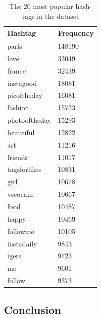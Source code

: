 \begin{center}
  \begin{table}
    \begin{tabular}{| l | l |}
      \hline
      \textbf{Hashtag} & \textbf{Frequency} \\ \hline
      paris & 148190 \\ \hline
      love & 33049 \\ \hline
      france & 32439 \\ \hline
      instagood & 18081 \\ \hline
      picoftheday & 16081 \\ \hline
      fashion & 15723 \\ \hline
      photooftheday & 15293 \\ \hline
      beautiful & 12822 \\ \hline
      art & 11216 \\ \hline
      friends & 11017 \\ \hline
      tagsforlikes & 10831 \\ \hline
      girl & 10678 \\ \hline
      vscocam & 10667 \\ \hline
      food & 10487 \\ \hline
      happy & 10469 \\ \hline
      followme & 10105 \\ \hline
      instadaily & 9843 \\ \hline
      igers & 9723 \\ \hline
      me & 9601 \\ \hline
      follow & 9373 \\ \hline
      \hline
    \end{tabular}
    \caption{The 20 most popular hash-tags in the dataset}
    \label{tbl:hashtags}
  \end{table}
\end{center}

\subsection{Conclusion}

